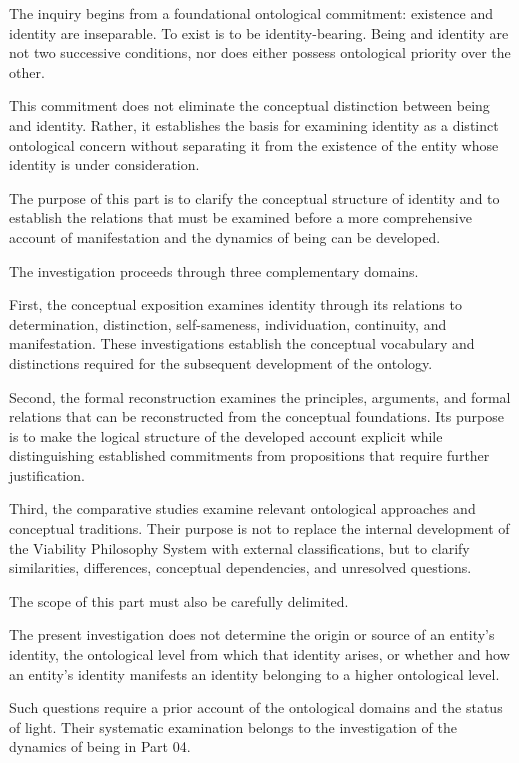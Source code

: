 The inquiry begins from a foundational ontological
commitment: existence and identity are inseparable.
To exist is to be identity-bearing. Being and identity
are not two successive conditions, nor does either
possess ontological priority over the other.

This commitment does not eliminate the conceptual
distinction between being and identity. Rather, it
establishes the basis for examining identity as a
distinct ontological concern without separating it
from the existence of the entity whose identity is
under consideration.

The purpose of this part is to clarify the conceptual
structure of identity and to establish the relations
that must be examined before a more comprehensive
account of manifestation and the dynamics of being
can be developed.

The investigation proceeds through three complementary
domains.

First, the conceptual exposition examines identity
through its relations to determination, distinction,
self-sameness, individuation, continuity, and
manifestation. These investigations establish the
conceptual vocabulary and distinctions required for
the subsequent development of the ontology.

Second, the formal reconstruction examines the
principles, arguments, and formal relations that
can be reconstructed from the conceptual foundations.
Its purpose is to make the logical structure of the
developed account explicit while distinguishing
established commitments from propositions that
require further justification.

Third, the comparative studies examine relevant
ontological approaches and conceptual traditions.
Their purpose is not to replace the internal
development of the Viability Philosophy System with
external classifications, but to clarify similarities,
differences, conceptual dependencies, and unresolved
questions.

The scope of this part must also be carefully
delimited.

The present investigation does not determine the
origin or source of an entity's identity, the
ontological level from which that identity arises,
or whether and how an entity's identity manifests
an identity belonging to a higher ontological level.

Such questions require a prior account of the
ontological domains and the status of light.
Their systematic examination belongs to the
investigation of the dynamics of being in Part 04.

